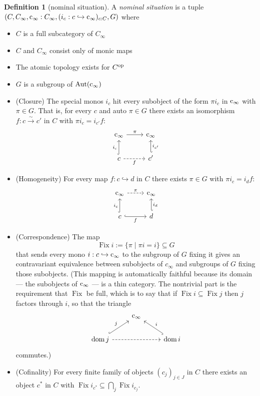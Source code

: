 \documentclass[
  sigconf,
  screen, ]{acmart}
\theoremstyle{definition}
\newtheorem{definition}[theorem]{Definition}
\newcommand\Aut{\operatorname{Aut}}
\newcommand{\dom}{\operatorname{dom}}
\newcommand\op{^{\rm op}}
\newcommand\Fix{\operatorname{Fix}}
\newcommand\cinfty{{{\rm c}_\infty}}
\begin{document}
\begin{definition}[nominal situation] \label{app:def:nominal-situation}
  A \emph{nominal situation}
  is a tuple $(C, C_\infty, \cinfty : C_\infty, (i_c : c\hookrightarrow \cinfty)_{c:C}, G)$ where
  \begin{itemize}
  \item $C$ is a full subcategory of $C_\infty$
  \item $C$ and $C_\infty$ consist only of monic maps
  \item The atomic topology exists for $C\op$
  \item $G$ is a subgroup of $\Aut(\cinfty)$
  \item (Closure) The special monos $i_c$ hit every subobject
    of the form $\pi i_c$ in
    $\cinfty$ with $\pi\in G$. That is, for every $c$
    and auto $\pi \in G$
    there exists an isomorphism $f : c\xrightarrow\sim c'$ in $C$ with $\pi i_c = i_{c'} f$:
    \[\begin{tikzcd}
    \cinfty \arrow[r, "\pi"]                 & \cinfty                    \\
    c \arrow[u, "i_c", hook] \arrow[r, "f"', dashed] & c' \arrow[u, "i_{c'}"', hook']
    \end{tikzcd}\]
  \item (Homogeneity)
    For every map $f : c\hookrightarrow d$ in $C$
    there exists $\pi\in G$
    with $\pi i_c = i_d f$:
    \[\begin{tikzcd}
    \cinfty \arrow[r, "\pi", dashed]                 & \cinfty                    \\
    c \arrow[u, "i_c", hook] \arrow[r, "f"', hook] & d \arrow[u, "i_d"', hook']
    \end{tikzcd}\]
  \item (Correspondence)
    The map
    \[ \Fix i := \{ \pi \mid \pi i = i \}\subseteq G \]
    that sends every mono $i : c\hookrightarrow\cinfty$
    to the subgroup of $G$ fixing it
    gives an contravariant equivalence between subobjects of 
    $c_\infty$ and subgroups of $G$ fixing those subobjects.
    (This mapping is automatically faithful
    because its domain --- the subobjects of $\cinfty$ --- is
    a thin category.
    The nontrivial part is the requirement that $\Fix$ be full,
    which is to say that if $\Fix i\subseteq\Fix j$
    then $j$ factors through $i$, so that the triangle
    \[ \begin{tikzcd}
                                                    & \cinfty &                               \\
    \dom j \arrow[ru, "j", hook] \arrow[rr, dashed] &         & \dom i \arrow[lu, "i"', hook]
    \end{tikzcd}\]
    commutes.)
  \item (Cofinality)
      For every finite family of objects $(c_j)_{j\in J}$ in $C$
      there exists an object $c^*$ in $C$
      with $\Fix i_{c^*}\subseteq\bigcap_j \Fix i_{c_j}$.
  \end{itemize}
\end{definition}
\end{document}
